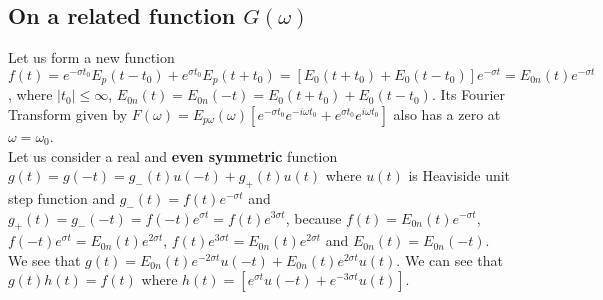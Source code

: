\documentclass[11pt]{elsarticle}
\begin{document}
\subsection{\label{sec:Section_2_1} \textbf{On a related function $G(\omega)$ } \protect\\  \lowercase{} }








Let us form a new function $f(t) = e^{-\sigma t_0} E_p(t - t_0) +  e^{\sigma t_0} E_p(t + t_0) = [  E_0(t + t_0) +  E_0(t - t_0)]  e^{-\sigma t} = E_{0n}(t) e^{-\sigma t} $, where $|t_0| \leq \infty$, $E_{0n}(t) = E_{0n}(-t) = E_0(t + t_0) +  E_0(t - t_0)$. Its Fourier Transform given by $F(\omega)=  E_{p\omega}(\omega) [ e^{-\sigma t_0} e^{-i \omega t_0} +  e^{\sigma t_0} e^{i \omega t_0} ]$ also has a zero at $\omega = \omega_{0}$.\\

Let us consider a real and \textbf{even symmetric} function  $g(t) = g(-t) = g_{-}(t)  u(-t) + g_{+}(t)  u(t)  $ where $u(t)$ is Heaviside unit step function and $g_{-}(t) = f(t) e^{-\sigma t}$ and $g_{+}(t) =  g_{-}(-t) = f(-t) e^{\sigma t} = f(t) e^{3 \sigma t}$, because $f(t)= E_{0n}(t) e^{-\sigma t} $, $f(-t) e^{\sigma t}= E_{0n}(t) e^{2 \sigma t}$, $f(t) e^{3 \sigma t} = E_{0n}(t) e^{2 \sigma t}$ and $E_{0n}(t) = E_{0n}(-t) $. We see that $g(t) = E_{0n}(t) e^{-2 \sigma t} u(-t) + E_{0n}(t) e^{2 \sigma t} u(t)  $. We can see that $g(t) h(t) = f(t)$ where $h(t)=[ e^{ \sigma t} u(-t) + e^{ - 3 \sigma t} u(t) ]$. \\
\end{document}
